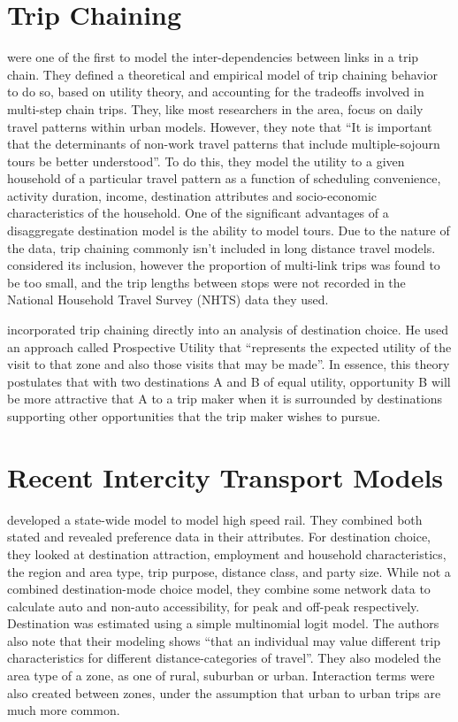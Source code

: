 \section{Trip Chaining}
\textcite{AdlerAkiva79} were one of the first to model the inter-dependencies between links in a trip chain. They defined a theoretical and empirical model of trip chaining behavior to do so, based on utility theory, and accounting for the tradeoffs involved in multi-step chain trips. They, like most researchers in the area, focus on daily travel patterns within urban models. However, they note that \enquote{It is important that the determinants of non-work travel patterns that include multiple-sojourn tours be better understood}. To do this, they model the utility to a given household of a particular travel pattern as a function of scheduling convenience, activity duration, income, destination attributes and socio-economic characteristics of the household.
One of the significant advantages of a disaggregate destination model is the ability to model tours. Due to the nature of the data, trip chaining commonly isn't included in long distance travel models. \textcite{Moeckel15} considered its inclusion, however the proportion of multi-link trips was found to be too small, and the trip lengths between stops were not recorded in the National Household Travel Survey (NHTS) data they used. 

\textcite{Kitamura84} incorporated trip chaining directly into an analysis of destination choice. He used an approach called Prospective Utility that \enquote{represents the expected utility of the visit to that zone and also those visits that may be made}. In essence, this theory postulates that with two destinations A and B of equal utility, opportunity B will be more attractive that A to a trip maker when it is surrounded by destinations supporting other opportunities that the trip maker wishes to pursue.

\section{Recent Intercity Transport Models}
\autocite{Outwater10} developed a state-wide model to model high speed rail. They combined both stated and revealed preference data in their attributes. For destination choice, they looked at destination attraction, employment and household characteristics, the region and area type, trip purpose, distance class, and party size. While not a combined destination-mode choice model, they combine some network data to calculate auto and non-auto accessibility, for peak and off-peak respectively. Destination was estimated using a simple multinomial logit model. The authors also note that their modeling shows \enquote{that an individual may value different trip characteristics for different distance-categories of travel}. They also modeled the area type of a zone, as one of rural, suburban or urban. Interaction terms were also created between zones, under the assumption that urban to urban trips are much more common.

